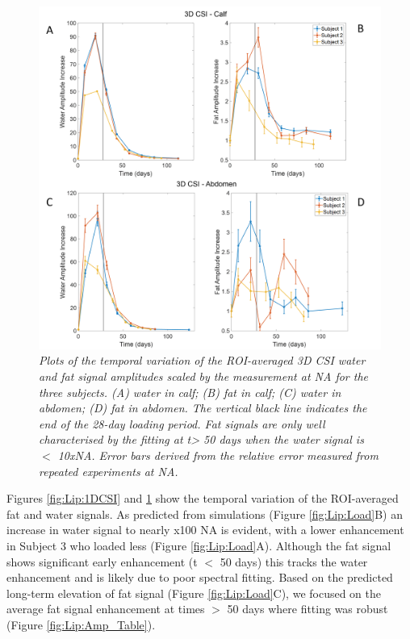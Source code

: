 \begin{figure}
    \centering
    \includegraphics[width=1\textwidth]{Figures/Lipid/3DCSI_Amplitude.png}
    \caption{\textit{Plots of the temporal variation of the \ac{ROI}-averaged 3D \ac{CSI} water and fat signal amplitudes scaled by the measurement at \ac{NA} for the three subjects. (A) water in calf; (B) fat in calf; (C) water in abdomen; (D) fat in abdomen. The vertical black line indicates the end of the 28-day loading period. Fat signals are only well characterised by the fitting at t> 50 days when the water signal is $<$ 10x\ac{NA}.  Error bars derived from the relative error measured from repeated experiments at NA.}}
    \label{fig:Lip:3DCSI}
\end{figure}

Figures \ref{fig:Lip:1DCSI} and \ref{fig:Lip:3DCSI} show the temporal variation of the \ac{ROI}-averaged fat and water signals. As predicted from simulations (Figure \ref{fig:Lip:Load}B) an increase in water signal to nearly x100 \ac{NA} is evident, with a lower enhancement in Subject 3 who loaded less (Figure \ref{fig:Lip:Load}A). Although the fat signal shows significant early enhancement (t $<$ 50 days) this tracks the water enhancement and is likely due to poor spectral fitting. Based on the predicted long-term elevation of fat signal (Figure \ref{fig:Lip:Load}C), we focused on the average fat signal enhancement at times $>$ 50 days where fitting was robust (Figure \ref{fig:Lip:Amp_Table}). 

